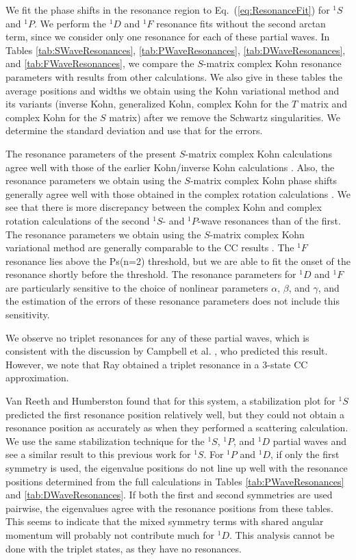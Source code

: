 \documentclass[preprint,showpacs,showkeys,preprintnumbers,amsmath,amssymb,longbibliography,pra,aps]{revtex4-1}
\begin{document}
{We fit the phase shifts in the resonance region to Eq.~(\ref{eq:ResonanceFit})
for $^1S$ and $^1P$. We perform the $^1D$ and $^1F$ resonance fits without 
the second arctan term, since we consider only
one resonance for each of these partial waves. In 
Tables \ref{tab:SWaveResonances}, \ref{tab:PWaveResonances},
\ref{tab:DWaveResonances}, and \ref{tab:FWaveResonances}, we compare the
$S$-matrix complex Kohn resonance parameters with results from other
calculations. We also give in these tables the average positions and widths
we obtain using the Kohn variational method and its variants
(inverse Kohn, generalized Kohn, complex Kohn for the $T$ matrix and complex 
Kohn for the
$S$ matrix) after we remove the Schwartz singularities. We determine the 
standard deviation and use that for the errors.

The resonance parameters of the present $S$-matrix complex Kohn calculations
agree well with those of the earlier Kohn/inverse Kohn calculations
\cite{VanReeth2004}. Also, the resonance parameters we obtain using the
$S$-matrix complex Kohn phase shifts generally agree well with those obtained
in the complex rotation calculations \cite{Yan1999,Yan1998a,Ho1998,Ho2000}.
We see that there is more discrepancy between the complex Kohn and complex
rotation calculations \cite{Yan1999,Yan1998a} of the second
$^1S$- and $^1P$-wave resonances than of the first. The resonance parameters
we obtain using the $S$-matrix complex Kohn variational method
are generally comparable to the CC results \cite{Walters2004}.
The $^1F$ resonance lies above the Ps(n=2) threshold, but we are able to
fit the onset of the resonance shortly before the threshold.
The resonance parameters for $^1D$ and $^1F$ are particularly
sensitive to the choice of nonlinear parameters $\alpha$, $\beta$, and $\gamma$,
and the estimation of the errors of these resonance parameters does not include
this sensitivity.

We observe no triplet resonances for any of these partial waves, which 
is consistent with the discussion by Campbell et al. \cite{Campbell1998}, 
who predicted this result.
However, we note that Ray \cite{Ray2006} obtained a triplet resonance in a
3-state CC approximation.

Van Reeth and Humberston \cite{VanReeth2004} found that for this 
system, a stabilization plot for $^1S$ predicted the first resonance position
relatively well, but they could not obtain a resonance position as accurately as when
they performed a scattering calculation. We use the same stabilization
technique for the $^1S$,
$^1P$, and $^1D$ partial waves and see a similar result to this previous work 
for $^1S$. For $^1P$ and $^1D$, if only the first symmetry is used, the 
eigenvalue positions do not line up well with the resonance positions 
determined from the full calculations in Tables \ref{tab:PWaveResonances} and 
\ref{tab:DWaveResonances}. If both the first and second symmetries are used 
pairwise, the eigenvalues agree with the resonance positions from these 
tables. This seems to indicate that the mixed symmetry terms with shared 
angular momentum will probably not contribute much for $^1D$. This analysis
cannot be done with the triplet states, as they have no resonances.

}
\end{document}
